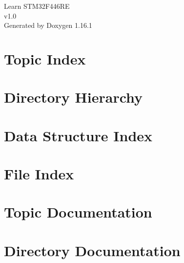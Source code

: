 \documentclass[twoside]{book}
\newcommand{\+}{\discretionary{\mbox{\scriptsize$\hookleftarrow$}}{}{}}
\newcommand{\clearemptydoublepage}{%
    \newpage{\pagestyle{empty}\cleardoublepage}%
  }
\begin{document}
  \raggedbottom
    \hypersetup{pageanchor=false,
                bookmarksnumbered=true,
                pdfencoding=unicode
               }
  \begin{titlepage}
  \vspace*{7cm}
  \begin{center}%
  {\Large Learn STM32\+F446\+RE}\\
  [1ex]\large v1.\+0 \\
  \vspace*{1cm}
  {\large Generated by Doxygen 1.16.1}\\
  \end{center}
  \end{titlepage}
  \clearemptydoublepage
  \tableofcontents
  \clearemptydoublepage
  \hypersetup{pageanchor=true}


\chapter{Topic Index}

\chapter{Directory Hierarchy}

\chapter{Data Structure Index}

\chapter{File Index}

\chapter{Topic Documentation}





\chapter{Directory Documentation}










\end{document}
